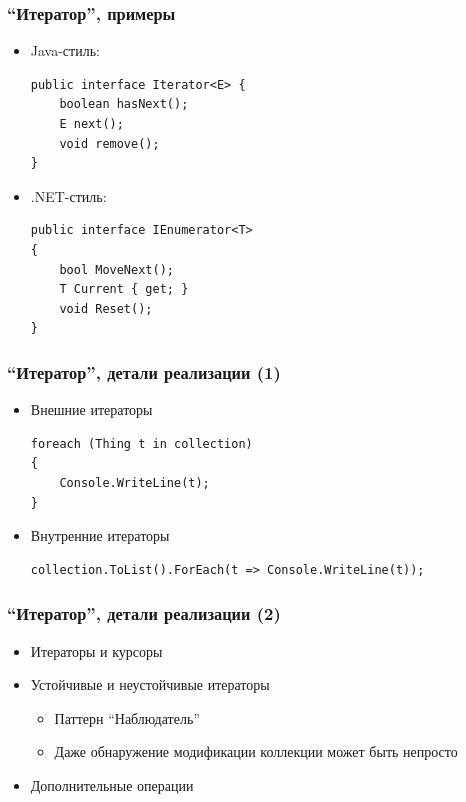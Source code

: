\documentclass{../../slides-style}
\begin{document}
    \begin{frame}[fragile]
        \frametitle{``Итератор'', примеры}
        \begin{itemize}
            \item Java-стиль:
            \begin{verbatim}
public interface Iterator<E> {
    boolean hasNext();
    E next();
    void remove();
}
            \end{verbatim}
            \item .NET-стиль:
            \begin{verbatim}
public interface IEnumerator<T>
{
    bool MoveNext();
    T Current { get; }
    void Reset();
}
            \end{verbatim}
        \end{itemize}
    \end{frame}

    \begin{frame}[fragile]
        \frametitle{``Итератор'', детали реализации (1)}
        \begin{itemize}
            \item Внешние итераторы
            \begin{verbatim}
foreach (Thing t in collection)
{
    Console.WriteLine(t);
} 
            \end{verbatim}
            \item Внутренние итераторы
            \begin{verbatim}
collection.ToList().ForEach(t => Console.WriteLine(t));
            \end{verbatim}
        \end{itemize}
    \end{frame}

    \begin{frame}
        \frametitle{``Итератор'', детали реализации (2)}
        \begin{itemize}
            \item Итераторы и курсоры
            \item Устойчивые и неустойчивые итераторы
            \begin{itemize}
                \item Паттерн ``Наблюдатель''
                \item Даже обнаружение модификации коллекции может быть непросто
            \end{itemize}
            \item Дополнительные операции
        \end{itemize}
    \end{frame}
\end{document}
